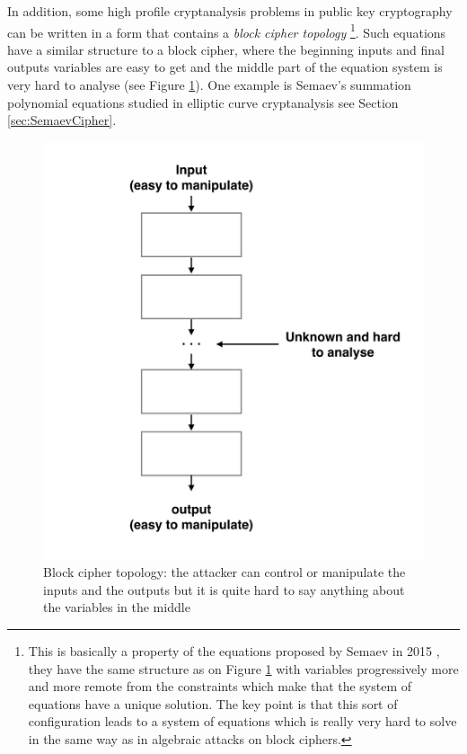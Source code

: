 In addition, some high profile cryptanalysis problems in public key cryptography can be written in a form that contains a \textit{block cipher topology} \footnote{
	This is basically a property of the equations proposed by Semaev in 2015 \cite{semaev2004summation,cryptoeprint:2015:310}, they have  the same structure as on Figure \ref{fig:blockciphertopology} with variables progressively more and more remote from the constraints which make that the system of equations have a unique solution. The key point is that this sort of configuration leads to a system of equations which is really very hard to solve in the same way as in algebraic attacks on block ciphers.}. Such equations have a similar structure to a block cipher, where the beginning inputs and final outputs variables are easy to get and the middle part of the equation system is very hard to analyse (see Figure \ref{fig:blockciphertopology}). One example is Semaev's summation polynomial equations studied in elliptic curve cryptanalysis \cite{semaev2004summation,cryptoeprint:2015:310} see Section \ref{sec:SemaevCipher}.      

\begin{figure}[h!]
	\centering
	\includegraphics[width=130mm]{./pics/block_cipher_topology2.png}	
	\caption[Block cipher topology] {Block cipher topology: the attacker can control or manipulate
		the inputs and the outputs but it is quite hard to say anything about the variables in the middle}
	\label{fig:blockciphertopology}
\end{figure}	

